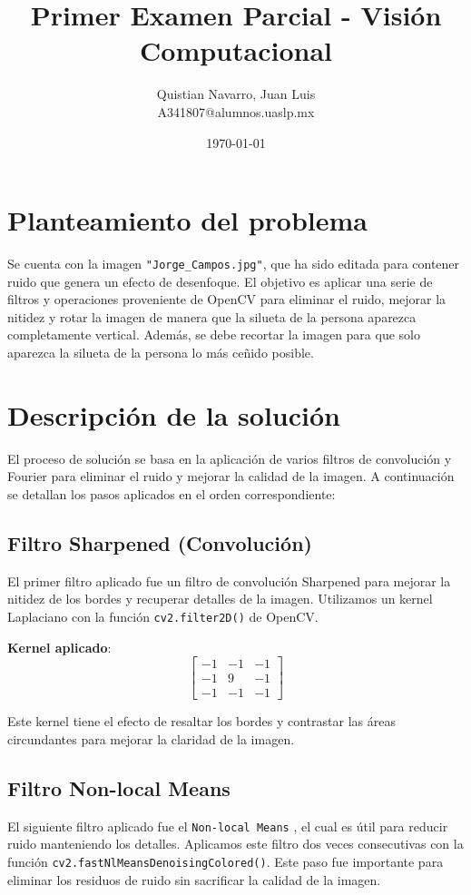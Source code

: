 \documentclass{article}
\title{Primer Examen Parcial - Visión Computacional}
\author{
  \begin{minipage}[t]{0.4\linewidth}
    \centering
    Quistian Navarro, Juan Luis\\
    A341807@alumnos.uaslp.mx 
  \end{minipage}
}
\date{\today}
\begin{document}
\maketitle
\section{Planteamiento del problema}
Se cuenta con la imagen \texttt{"Jorge\_Campos.jpg"}, que ha sido editada para contener ruido que genera un efecto de desenfoque. El objetivo es aplicar una serie de filtros y operaciones proveniente de OpenCV \cite{opencvimgprocfilter} para eliminar el ruido, mejorar la nitidez y rotar la imagen de manera que la silueta de la persona aparezca completamente vertical. Además, se debe recortar la imagen para que solo aparezca la silueta de la persona lo más ceñido posible.

\section{Descripción de la solución}
El proceso de solución se basa en la aplicación de varios filtros de convolución y Fourier para eliminar el ruido y mejorar la calidad de la imagen. A continuación se detallan los pasos aplicados en el orden correspondiente:

\subsection{Filtro Sharpened (Convolución)}
El primer filtro aplicado fue un filtro de convolución Sharpened para mejorar la nitidez de los bordes y recuperar detalles de la imagen. Utilizamos un kernel Laplaciano con la función \texttt{cv2.filter2D()} de OpenCV.

\textbf{Kernel aplicado}:
\[
    \begin{bmatrix}
        -1 & -1 & -1 \\
        -1 & 9  & -1 \\
        -1 & -1 & -1
    \end{bmatrix}
\]

Este kernel tiene el efecto de resaltar los bordes y contrastar las áreas circundantes para mejorar la claridad de la imagen.

\subsection{Filtro Non-local Means}
El siguiente filtro aplicado fue el \texttt{Non-local Means} \cite{opencv_non_local_means}, el cual es útil para reducir ruido manteniendo los detalles. Aplicamos este filtro dos veces consecutivas con la función \texttt{cv2.fastNlMeansDenoisingColored()}. Este paso fue importante para eliminar los residuos de ruido sin sacrificar la calidad de la imagen.
\end{document}
